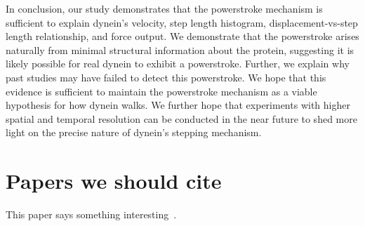 \documentclass[9pt,twocolumn,twoside]{article}
\begin{document}
In conclusion, our study demonstrates that the powerstroke mechanism is sufficient to explain dynein's velocity, step length histogram, displacement-vs-step length relationship, and force output. We demonstrate that the powerstroke arises naturally from minimal structural information about the protein, suggesting it is likely possible for real dynein to exhibit a powerstroke. Further, we explain why past studies may have failed to detect this powerstroke. We hope that this evidence is sufficient to maintain the powerstroke mechanism as a viable hypothesis for how dynein walks. We further hope that experiments with higher spatial and temporal resolution can be conducted in the near future to shed more light on the precise nature of dynein's stepping mechanism.

\section{Papers we should cite}
This paper says something interesting~\cite{leschziner}.



\end{document}
